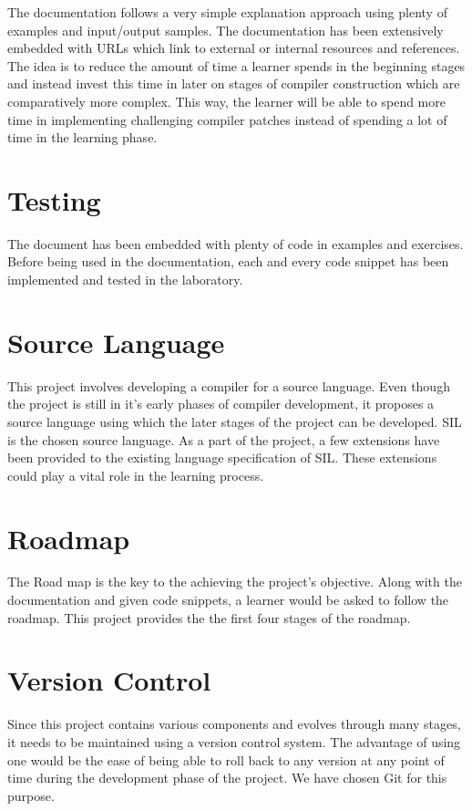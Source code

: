 The documentation follows a very simple explanation approach using plenty of examples and input/output samples. The documentation has been extensively embedded with URLs which link to external or internal resources and references. The idea is to reduce the amount of time a learner spends in the beginning stages and instead invest this time in later on stages of compiler construction which are comparatively more complex. This way, the learner will be able to spend more time in implementing challenging compiler patches instead of spending a lot of time in the learning phase.

\section{Testing}

The document has been embedded with plenty of code in examples and exercises. Before being used in the documentation, each and every code snippet has been implemented and tested in the laboratory. 

\section{Source Language}

This project involves developing a compiler for a source language. Even though the project is still in it's early phases of compiler development, it proposes a source language using which the later stages of the project can be developed.  SIL\cite{citation-3-name-here} is the chosen source language. As a part of the project, a few extensions have been provided to the existing language specification of SIL. These extensions could play a vital role in the learning process.
 
\section{Roadmap}

The Road map is the key to the achieving the project's objective. Along with the documentation and given code snippets, a learner would be asked to follow the roadmap. This project provides the the first four stages of the roadmap.
 
\section{Version Control}
Since this project contains various components and evolves through many stages, it needs to be maintained using a version control system. The advantage of using one would be the ease of  being able to roll back to any version at any point of time during the development phase of the project. We have chosen Git for this purpose.

